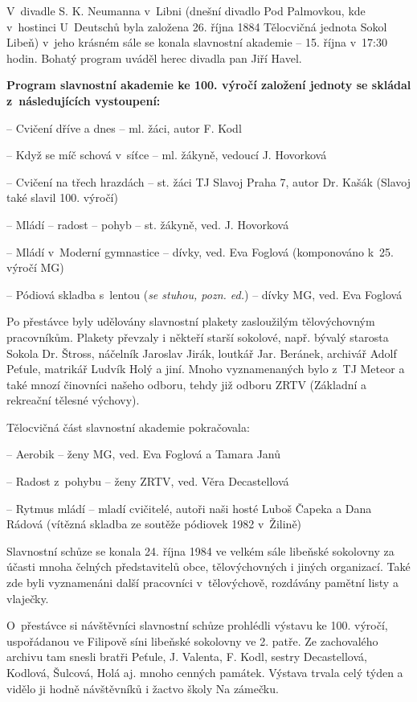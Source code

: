 \documentclass[a5paper, 11pt, twoside]{article}
\begin{document}
V~divadle S. K. Neumanna v~Libni (dnešní divadlo Pod Palmovkou, kde
v~hostinci U~Deutschů byla založena 26. října 1884 Tělocvičná jednota
Sokol Libeň) v~jeho krásném sále se konala slavnostní akademie -- 15.
října v~17:30 hodin. Bohatý program uváděl herec divadla pan Jiří Havel.

\textbf{Program slavnostní akademie ke 100. výročí založení jednoty se
skládal z~následujících vystoupení:}

-- Cvičení dříve a dnes -- ml. žáci, autor F. Kodl

-- Když se míč schová v~síťce -- ml. žákyně, vedoucí J. Hovorková

-- Cvičení na třech hrazdách -- st. žáci TJ Slavoj Praha 7, autor Dr.
Kašák (Slavoj také slavil 100. výročí)

-- Mládí -- radost -- pohyb -- st. žákyně, ved. J. Hovorková

-- Mládí v~Moderní gymnastice -- dívky, ved. Eva Foglová (komponováno
k~25. výročí MG)

-- Pódiová skladba s~lentou (\textit{se stuhou, pozn. ed.}) -- dívky MG,
ved. Eva Foglová

Po přestávce byly udělovány slavnostní plakety zasloužilým tělovýchovným
pracovníkům. Plakety převzaly i někteří starší sokolové, např. bývalý
starosta Sokola Dr. Štross, náčelník Jaroslav Jirák, loutkář Jar.
Beránek, archivář Adolf Peťule, matrikář Ludvík Holý a jiní. Mnoho
vyznamenaných bylo z~TJ Meteor a také mnozí činovníci našeho odboru,
tehdy již odboru ZRTV (Základní a rekreační tělesné výchovy).

Tělocvičná část slavnostní akademie pokračovala:

-- Aerobik -- ženy MG, ved. Eva Foglová a Tamara Janů

-- Radost z~pohybu -- ženy ZRTV, ved. Věra Decastellová

-- Rytmus mládí -- mladí cvičitelé, autoři naši hosté Luboš Čapeka a
Dana Rádová (vítězná skladba ze soutěže pódiovek 1982 v~Žilině)

Slavnostní schůze se konala 24. října 1984 ve velkém sále libeňské
sokolovny za účasti mnoha čelných představitelů obce, tělovýchovných i
jiných organizací. Také zde byli vyznamenáni další pracovníci
v~tělovýchově, rozdávány pamětní listy a vlaječky.

O~přestávce si návštěvníci slavnostní schůze prohlédli výstavu ke 100.
výročí, uspořádanou ve Filipově síni libeňské sokolovny ve 2. patře. Ze
zachovalého archivu tam snesli bratři Peťule, J. Valenta, F. Kodl,
sestry Decastellová, Kodlová, Šulcová, Holá aj. mnoho cenných památek.
Výstava trvala celý týden a vidělo ji hodně návštěvníků i žactvo školy
Na zámečku.
\end{document}
